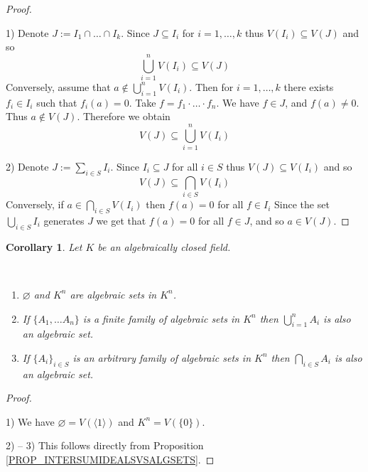 \documentclass[12pt, letterpaper, oneside]{article}
\theoremstyle{plain}
\newtheorem{corollary}[theorem]{Corollary}
\theoremstyle{definition}
\newcommand{\subgp}[1]{\langle#1\rangle}
\newcommand{\benu}{\begin{enumerate}}
\newcommand{\eenu}{\end{enumerate}}
\newcommand{\vs}{\vskip 5mm}
\begin{document}
\begin{proof} \ 

1)  Denote $J := I_{1}\cap \dots \cap I_{k}$. Since $J \subseteq I_{i}$ for $i=1,\dots, k$
thus $V(I_{i}) \subseteq V(J) $ and so   
$$ \bigcup_{i=1}^{n} V(I_{i}) \subseteq V(J)$$
Conversely, assume that $a\not\in  \bigcup_{i=1}^{n} V(I_{i})$. Then for $i= 1, \dots, k$
there exists $f_{i}\in I_{i}$ such that $f_{i}(a) = 0$. Take $f = f_{1}\cdot{\dots}\cdot f_{n}$. 
We have $f\in J$,  and $f(a) \neq 0$. Thus $a\not\in V(J)$.  Therefore we obtain
$$ V(J) \subseteq  \bigcup_{i=1}^{n} V(I_{i}) $$


\vs 


2)  Denote $J:= \sum_{i\in S} I_{i}$.
Since $I_{i} \subseteq J$ for all $i\in S$ thus $V(J) \subseteq V(I_{i})$ and so 
 $$V(J) \subseteq \bigcap_{i\in S} V(I_{i})$$
Conversely, if $a\in  \bigcap_{i\in S} V(I_{i})$ then $f(a)=0$ for  all $f\in I_{i}$
Since the set $\bigcup_{i\in S}I_{i}$ generates $J$ we get that $f(a)=0$ for all $f\in J$, 
and so $a\in V(J)$.   

\end{proof}


\vs\vs


\begin{corollary}
\label{COR_ALGSETSARECLOSED}
Let $K$ be an algebraically closed field. 

\vskip -13mm 

\ 
\benu
\item $\varnothing$ and $K^{n}$ are algebraic sets in $K^{n}$.  
\item If $\{A_{1}, \dots A_{n}\}$ is a finite family of algebraic sets in $K^{n}$
then $\bigcup_{i=1}^{n} A_{i}$ is also an algebraic set. 
\item If $\{A_{i}\}_{i\in S}$ is an arbitrary family of algebraic sets in $K^{n}$
then $\bigcap_{i\in S} A_{i}$ is also an algebraic set. 
\eenu
\end{corollary}

\vs

\begin{proof} \ 

1) We have $\varnothing = V(\subgp{1})$ and $K^{n} = V(\{0\})$. 

\vs

2) -- 3)  This follows directly from Proposition \ref{PROP_INTERSUMIDEALSVSALGSETS}.


\end{proof}

\vs\vs
\end{document}
